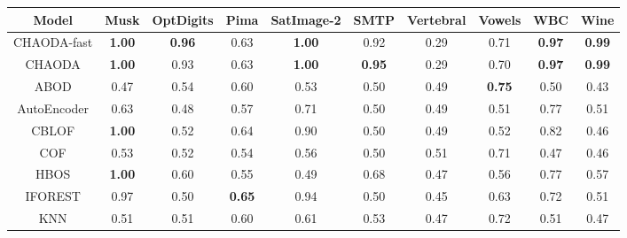 \begin{table*}[!t]
\begin{center}
\begin{small}
\begin{tabular}{|c|c|c|c|c|c|c|c|c|c|}
\hline
\textbf{Model} & \textbf{Musk} & \textbf{OptDigits} & \textbf{Pima} & \textbf{SatImage-2} & \textbf{SMTP} & \textbf{Vertebral} & \textbf{Vowels} &  \textbf{WBC} & \textbf{Wine} \\
\hline
        CHAODA-fast & \textbf{1.00} &      \textbf{0.96} &          0.63 &       \textbf{1.00} &          0.92 &               0.29 &            0.71 & \textbf{0.97} & \textbf{0.99} \\
\hline
        CHAODA & \textbf{1.00} &               0.93 &          0.63 &       \textbf{1.00} & \textbf{0.95} &               0.29 &            0.70 & \textbf{0.97} & \textbf{0.99} \\
\hline
                ABOD &          0.47 &               0.54 &          0.60 &                0.53 &          0.50 &               0.49 &   \textbf{0.75} &          0.50 &          0.43 \\
\hline
        AutoEncoder &          0.63 &               0.48 &          0.57 &                0.71 &          0.50 &               0.49 &            0.51 &          0.77 &          0.51 \\
\hline
                CBLOF & \textbf{1.00} &               0.52 &          0.64 &                0.90 &          0.50 &               0.49 &            0.52 &          0.82 &          0.46 \\
\hline
                COF &          0.53 &               0.52 &          0.54 &                0.56 &          0.50 &               0.51 &            0.71 &          0.47 &          0.46 \\
\hline
                HBOS & \textbf{1.00} &               0.60 &          0.55 &                0.49 &          0.68 &               0.47 &            0.56 &          0.77 &          0.57 \\
\hline
        IFOREST &          0.97 &               0.50 & \textbf{0.65} &                0.94 &          0.50 &               0.45 &            0.63 &          0.72 &          0.51 \\
\hline
                KNN &          0.51 &               0.51 &          0.60 &                0.61 &          0.53 &               0.47 &            0.72 &          0.51 &          0.47 \\

\end{tabular}
\end{small}
\end{center}
\end{table*}
